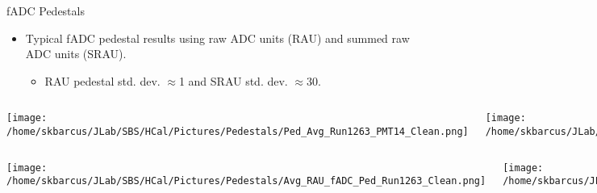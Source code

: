 \documentclass[10pt]{beamer}
\begin{document}
\begin{frame}{fADC Pedestals}

	\begin{itemize}
		\item Typical fADC pedestal results using raw ADC units (RAU) and summed raw ADC units (SRAU).
			\begin{itemize}
				\item[--] RAU pedestal std. dev. $\approx$1 and SRAU std. dev. $\approx$30.
			\end{itemize}
	\end{itemize}

	\vspace{-6mm}

	\begin{columns}[T,onlytextwidth]
	\begin{center}
		\texttt{[image: /home/skbarcus/JLab/SBS/HCal/Pictures/Pedestals/Ped\_Avg\_Run1263\_PMT14\_Clean.png]}
  	\end{center}
	
	\begin{center}
		\texttt{[image: /home/skbarcus/JLab/SBS/HCal/Pictures/Pedestals/Ped\_Int\_Run1263\_PMT14\_Clean.png]}
  	\end{center}
	
	\end{columns}
	
	\begin{columns}[T,onlytextwidth]
	\begin{center}
		\texttt{[image: /home/skbarcus/JLab/SBS/HCal/Pictures/Pedestals/Avg\_RAU\_fADC\_Ped\_Run1263\_Clean.png]}
  	\end{center}
	
	\begin{center}
		\texttt{[image: /home/skbarcus/JLab/SBS/HCal/Pictures/Pedestals/Avg\_RAU\_fADC\_Ped\_Std\_Dev\_Run1263\_Clean.png]}
  	\end{center}
	
	\end{columns}

\end{frame}
\end{document}

